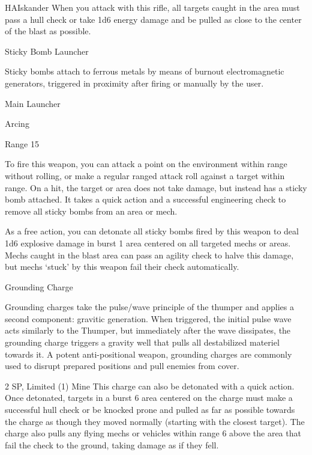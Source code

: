 \begin{mech}{HA}{Iskander}
When you attack with this rifle, all targets caught in the area must pass a hull check or take 1d6 energy damage and be pulled as close to the center of the blast as possible.


Sticky Bomb Launcher

Sticky bombs attach to ferrous metals by means of burnout electromagnetic generators, triggered in proximity after firing or manually by the user.

Main Launcher

Arcing

Range 15

To fire this weapon, you can attack a point on the environment within range without rolling, or make a regular ranged attack roll against a target within range. On a hit, the target or area does not take damage, but instead has a sticky bomb attached. It takes a quick action and a successful engineering check to remove all sticky bombs from an area or mech.

As a free action, you can detonate all sticky bombs fired by this weapon to deal 1d6 explosive damage in burst 1 area centered on all targeted mechs or areas. Mechs caught in the blast area can pass an agility check to halve this damage, but mechs ‘stuck’ by this weapon fail their check automatically.


Grounding Charge

Grounding charges take the pulse/wave principle of the thumper and applies a second component: gravitic generation. When triggered, the initial pulse wave acts similarly to the Thumper, but immediately after the wave dissipates, the grounding charge triggers a gravity well that pulls all destabilized materiel towards it. A potent anti-positional weapon, grounding charges are commonly used to disrupt prepared positions and pull enemies from cover.

2 SP, Limited (1)
Mine
This charge can also be detonated with a quick action. Once detonated, targets in a burst 6 area centered on the charge must make a successful hull check or be knocked prone and pulled as far as possible towards the charge as though they moved normally (starting with the closest target). The charge also pulls any flying mechs or vehicles within range 6 above the area that fail the check to the ground, taking damage as if they fell.

\end{mech}